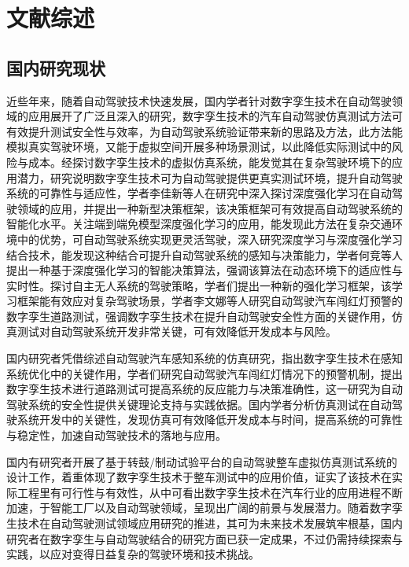 \section{文献综述}

\subsection{国内研究现状}

近些年来，随着自动驾驶技术快速发展，国内学者针对数字孪生技术在自动驾驶领域的应用展开了广泛且深入的研究，数字孪生技术的汽车自动驾驶仿真测试方法可有效提升测试安全性与效率，为自动驾驶系统验证带来新的思路及方法，此方法能模拟真实驾驶环境，又能于虚拟空间开展多种场景测试，以此降低实际测试中的风险与成本\cite{文谢2023基于数字孪生的汽车自动驾驶仿真测试方法}。经探讨数字孪生技术的虚拟仿真系统，能发觉其在复杂驾驶环境下的应用潜力，研究说明数字孪生技术可为自动驾驶提供更真实测试环境，提升自动驾驶系统的可靠性与适应性\cite{彭博2023基于数字孪生的虚拟仿真系统研究与应用}，学者李佳新等人在研究中深入探讨深度强化学习在自动驾驶领域的应用，并提出一种新型决策框架，该决策框架可有效提高自动驾驶系统的智能化水平。关注端到端免模型深度强化学习的应用，能发现此方法在复杂交通环境中的优势，可自动驾驶系统实现更灵活驾驶，深入研究深度学习与深度强化学习结合技术，能发现这种结合可提升自动驾驶系统的感知与决策能力，学者何竞等人提出一种基于深度强化学习的智能决策算法，强调该算法在动态环境下的适应性与实时性。探讨自主无人系统的驾驶策略，学者们提出一种新的强化学习框架，该学习框架能有效应对复杂驾驶场景，学者李文娜\cite{李文娜2024自动驾驶汽车闯红灯预警数字孪生道路测试}等人研究自动驾驶汽车闯红灯预警的数字孪生道路测试，强调数字孪生技术在提升自动驾驶安全性方面的关键作用，仿真测试对自动驾驶系统开发非常关键，可有效降低开发成本与风险。

国内研究者凭借综述自动驾驶汽车感知系统的仿真研究，指出数字孪生技术在感知系统优化中的关键作用，学者们研究自动驾驶汽车闯红灯情况下的预警机制，提出数字孪生技术进行道路测试可提高系统的反应能力与决策准确性，这一研究为自动驾驶系统的安全性提供关键理论支持与实践依据。国内学者分析仿真测试在自动驾驶系统开发中的关键性，发现仿真可有效降低开发成本与时间，提高系统的可靠性与稳定性，加速自动驾驶技术的落地与应用\cite{杨海清2024仿真测试在自动驾驶系统开发中的重要性}。

国内有研究者开展了基于转鼓/制动试验平台的自动驾驶整车虚拟仿真测试系统\cite{田常青2024基于转鼓}的设计工作，着重体现了数字孪生技术于整车测试中的应用价值，证实了该技术在实际工程里有可行性与有效性，从中可看出数字孪生技术在汽车行业的应用进程不断加速，于智能工厂以及自动驾驶领域，呈现出广阔的前景与发展潜力\cite{高驰2023智能工厂}。随着数字孪生技术在自动驾驶测试领域应用研究的推进，其可为未来技术发展筑牢根基，国内研究者在数字孪生与自动驾驶结合的研究方面已获一定成果，不过仍需持续探索与实践，以应对变得日益复杂的驾驶环境和技术挑战。

